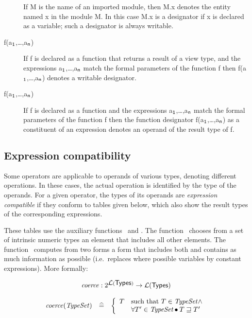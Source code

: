 \begin{description}
If {\sf M} is the name of an imported module, then {\sf M.x} denotes
the entity named {\sf x} in the module {\sf M}. In this case {\sf M.x}
is a designator if {\sf x} is declared as a variable; such a
designator is always writable.


\item[{\sf f(a$_{\sf 1}$,\ldots,a$_{\sf n}$)}]

If {\sf f} is declared as a function that returns a result of a view
type, and the expressions {\sf a$_{\sf 1}$,\ldots,a$_{\sf n}$} match the
formal parameters of the function {\sf f} then {\sf
f(a$_{\sf 1}$,\ldots,a$_{\sf n}$)} denotes a writable designator.

\item[{\sf f(a$_{\sf 1}$,\ldots,a$_{\sf n}$)}]

If {\sf f} is declared as a function and the expressions {\sf a$_{\sf
1}$,\ldots,a$_{\sf n}$} match the formal parameters of the function
{\sf f} then the function designator {\sf f(a$_{\sf 1}$,\ldots,a$_{\sf
n}$)} as a constituent of an expression denotes an operand of the
result type of {\sf f}.

\end{description}

\subsection*{Expression compatibility}

Some operators are applicable to operands of various types, denoting
different operations. In these cases, the actual operation is
identified by the type of the operands. For a given operator, the
types of its operands are {\em expression compatible} if they conform
to tables given below, which also show the result types of the
corresponding expressions. 

These tables use the auxiliary functions \coerce\ and \MaxDim. The
function \coerce\ chooses from a set of intrinsic numeric types an
element that includes all other elements. The function \MaxDim\
computes from two forms a form that includes both and contains as much
information as possible (i.e.\ replaces where possible variables by
constant expressions). More formally:

\[
\begin{array}{rcl}
\multicolumn{3}{c}{
\coerce: 2^{\Language{\NT{Types}}} \rightarrow \Language{\NT{Types}}}\\
\hlf
\coerce(\mbox{\em TypeSet\/}) & \widehat{=} & \left\{
  \begin{array}{ll}
  T & \mbox{such that } T \in \mbox{\em TypeSet\/} \wedge \\
    &  \forall T' \in \mbox{\em TypeSet} \bullet T
      \sqsupseteq T' \\
  \end{array}\right.\\
\end{array}
\]

